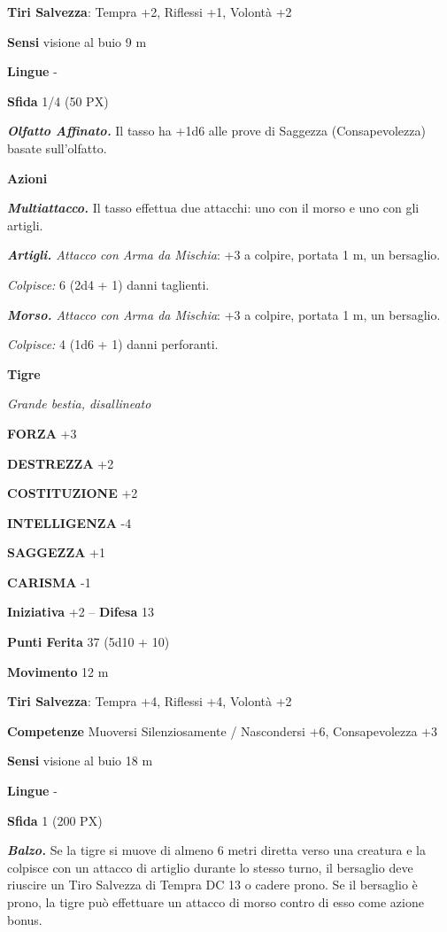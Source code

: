 \begin{multicols}{2}
	\textbf{Tiri Salvezza}: Tempra +2, Riflessi +1, Volontà +2

	\textbf{Sensi} visione al buio 9 m

	\textbf{Lingue} -

	\textbf{Sfida} 1/4 (50 PX)

	\textit{\textbf{Olfatto Affinato.}} Il tasso ha +1d6 alle prove di Saggezza (Consapevolezza) basate sull'olfatto.

	\textbf{Azioni}

	\textit{\textbf{Multiattacco.}} Il tasso effettua due attacchi: uno con il morso e uno con gli artigli.

	\textit{\textbf{Artigli.} Attacco con Arma da Mischia}: +3 a colpire, portata 1 m, un bersaglio.

	\textit{Colpisce:} 6 (2d4 + 1) danni taglienti.

	\textit{\textbf{Morso.} Attacco con Arma da Mischia}: +3 a colpire, portata 1 m, un bersaglio.

	\textit{Colpisce:} 4 (1d6 + 1) danni perforanti.

	\medskip\textbf{Tigre}

	\textit{Grande bestia, disallineato}

	\textbf{FORZA} +3

	\textbf{DESTREZZA} +2

	\textbf{COSTITUZIONE} +2

	\textbf{INTELLIGENZA} -4

	\textbf{SAGGEZZA} +1

	\textbf{CARISMA} -1

	\textbf{Iniziativa} +2 -- \textbf{Difesa} 13

	\textbf{Punti Ferita} 37 (5d10 + 10)

	\textbf{Movimento} 12 m

	\textbf{Tiri Salvezza}: Tempra +4, Riflessi +4, Volontà +2

	\textbf{Competenze} Muoversi Silenziosamente / Nascondersi +6, Consapevolezza +3

	\textbf{Sensi} visione al buio 18 m

	\textbf{Lingue} -

	\textbf{Sfida} 1 (200 PX)

	\textit{\textbf{Balzo.}} Se la tigre si muove di almeno 6 metri diretta verso una creatura e la colpisce con un attacco di artiglio durante lo stesso turno, il bersaglio deve riuscire un Tiro Salvezza di Tempra DC 13 o cadere prono. Se il bersaglio è prono, la tigre può effettuare un attacco di morso contro di esso come azione bonus.


\end{multicols}
